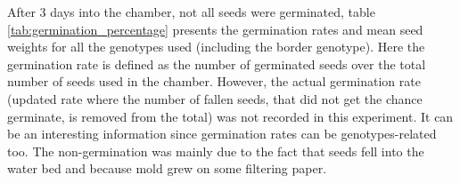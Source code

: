 After 3 days into the chamber, not all seeds were germinated, table \ref{tab:germination_percentage} presents the germination 
rates and mean seed weights for all the genotypes used (including the border genotype). Here the germination rate is defined as the number of germinated seeds over the total number of seeds used in the chamber. However, the actual germination rate (updated rate where the number of fallen seeds, that did not get the chance germinate, is removed from the total) was not recorded in this experiment. It can be an interesting information since germination rates can be genotypes-related too. The non-germination was mainly due to 
the fact that seeds fell into the water bed and because mold grew on some filtering paper.


